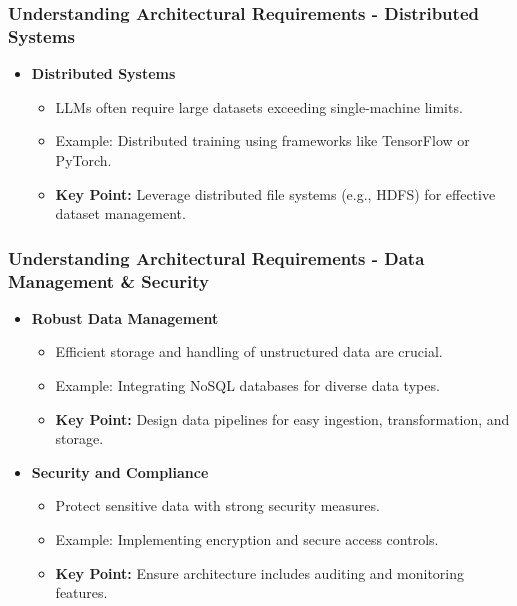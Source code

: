 \documentclass[aspectratio=169]{beamer}
\begin{document}
\begin{frame}[fragile]
    \frametitle{Understanding Architectural Requirements - Distributed Systems}
    \begin{itemize}
        \item \textbf{Distributed Systems}
        \begin{itemize}
            \item LLMs often require large datasets exceeding single-machine limits.
            \item Example: Distributed training using frameworks like TensorFlow or PyTorch.
            \item \textbf{Key Point:} Leverage distributed file systems (e.g., HDFS) for effective dataset management.
        \end{itemize}
    \end{itemize}
\end{frame}

\begin{frame}[fragile]
    \frametitle{Understanding Architectural Requirements - Data Management & Security}
    \begin{itemize}
        \item \textbf{Robust Data Management}
        \begin{itemize}
            \item Efficient storage and handling of unstructured data are crucial.
            \item Example: Integrating NoSQL databases for diverse data types.
            \item \textbf{Key Point:} Design data pipelines for easy ingestion, transformation, and storage.
        \end{itemize}
        
        \item \textbf{Security and Compliance}
        \begin{itemize}
            \item Protect sensitive data with strong security measures.
            \item Example: Implementing encryption and secure access controls.
            \item \textbf{Key Point:} Ensure architecture includes auditing and monitoring features.
        \end{itemize}
    \end{itemize}
\end{frame}
\end{document}
